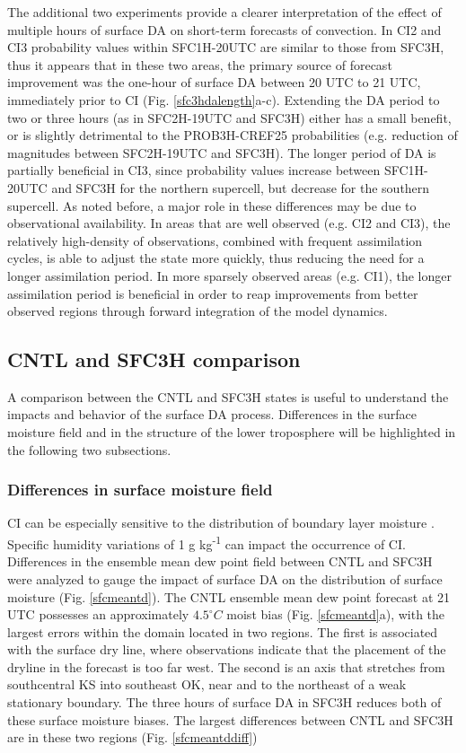 The additional two experiments provide a clearer interpretation of the effect of multiple hours of surface DA on short-term forecasts of convection. In CI2 and CI3 probability values within SFC1H-20UTC are similar to those from SFC3H, thus it appears that in these two areas, the primary source of forecast improvement was the one-hour of surface DA between 20 UTC to 21 UTC, immediately prior to CI (Fig. \ref{sfc3hdalength}a-c). Extending the DA period to two or three hours (as in SFC2H-19UTC and SFC3H) either has a small benefit, or is slightly detrimental to the PROB3H-CREF25 probabilities (e.g. reduction of magnitudes between SFC2H-19UTC and SFC3H). The longer period of DA is partially beneficial in CI3, since probability values increase between SFC1H-20UTC and SFC3H for the northern supercell, but decrease for the southern supercell. As noted before, a major role in these differences may be due to observational availability. In areas that are well observed (e.g. CI2 and CI3), the relatively high-density of observations, combined with frequent assimilation cycles, is able to adjust the state more quickly, thus reducing the need for a longer assimilation period. In more sparsely observed areas (e.g. CI1), the longer assimilation period is beneficial in order to reap improvements from better observed regions through forward integration of the model dynamics.

\subsection{CNTL and SFC3H comparison}
A comparison between the CNTL and SFC3H states is useful to understand the impacts and behavior of the surface DA process. Differences in the surface moisture field and in the structure of the lower troposphere will be highlighted in the following two subsections.

\subsubsection{Differences in surface moisture field}
\label{tdsection}
CI can be especially sensitive to the distribution of boundary layer moisture \citep{crook96,weckwerth00}. Specific humidity variations of 1 g kg\textsuperscript{-1} can impact the occurrence of CI. Differences in the ensemble mean dew point field between CNTL and SFC3H were analyzed to gauge the impact of surface DA on the distribution of surface moisture (Fig. \ref{sfcmeantd}). The CNTL ensemble mean dew point forecast at 21 UTC possesses an approximately \(4.5^{\circ}C\) moist bias (Fig. \ref{sfcmeantd}a), with the largest errors within the domain located in two regions. The first is associated with the surface dry line, where observations indicate that the placement of the dryline in the forecast is too far west. The second is an axis that stretches from southcentral KS into southeast OK, near and to the northeast of a weak stationary boundary. The three hours of surface DA in SFC3H reduces both of these surface moisture biases. The largest differences between CNTL and SFC3H are in these two regions (Fig. \ref{sfcmeantddiff})


